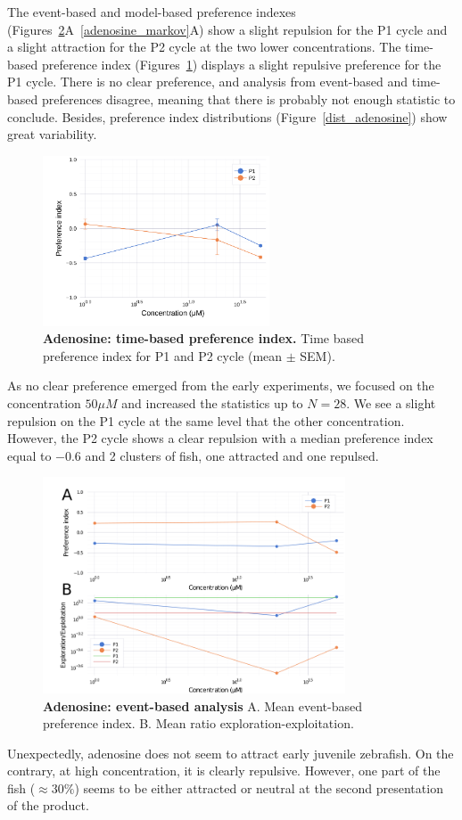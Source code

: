   The event-based and model-based preference indexes (Figures~\ref{adenosine_event}A~\ref{adenosine_markov}A) show a slight repulsion for the P1 cycle and a slight attraction for the P2 cycle at the two lower concentrations.  The time-based preference index (Figures~\ref{adenosine}) displays a slight repulsive preference for the P1 cycle. There is no clear preference, and analysis from event-based and time-based preferences disagree, meaning that there is probably not enough statistic to conclude. Besides, preference index distributions (Figure~\ref{dist_adenosine}) show great variability.
    \begin{figure}[h!]
      \centering
      \includegraphics[width=0.6\textwidth]{part_2/assets/adenosine.png}
      \caption{\textbf{Adenosine: time-based preference index.} Time based preference index for P1 and P2 cycle (mean $\pm$ SEM).}
      \label{adenosine}
    \end{figure}
As no clear preference emerged from the early experiments, we focused on the concentration $50 \mu M$ and increased the statistics up to $N=28$. We see a slight repulsion on the P1 cycle at the same level that the other concentration. However, the P2 cycle shows a clear repulsion with a median preference index equal to $-0.6$ and 2 clusters of fish, one attracted and one repulsed.
    \begin{figure}[h!]
      \centering
      \includegraphics[width=0.8\textwidth]{part_2/assets/adenosine_event.png}
      \caption{\textbf{Adenosine: event-based analysis} A. Mean event-based preference index. B. Mean ratio exploration-exploitation.}
      \label{adenosine_event}
    \end{figure}
  Unexpectedly, adenosine does not seem to attract early juvenile zebrafish. On the contrary, at high concentration, it is clearly repulsive. However, one part of the fish ($\approx 30 \%$) seems to be either attracted or neutral at the second presentation of the product.

